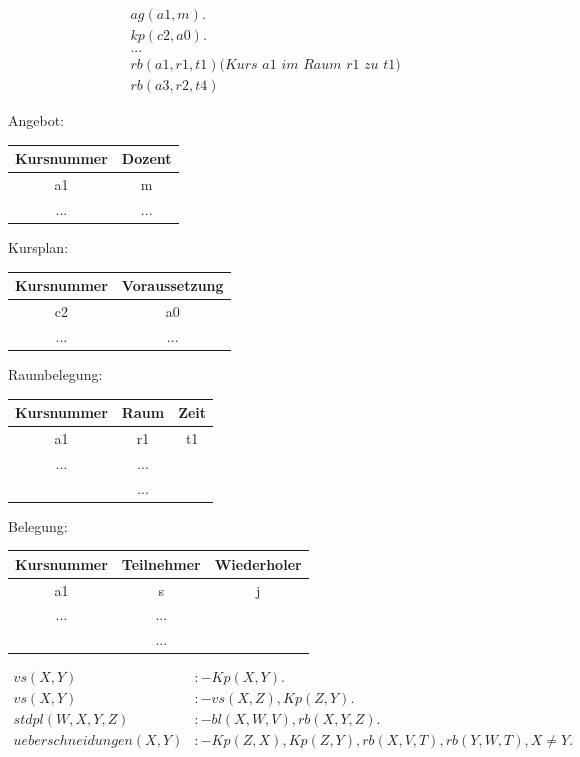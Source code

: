 \documentclass[12pt, a4paper]{article}
\begin{document}
\begin{equation}
\begin{split}
&ag(a1, m).\\
&kp(c2, a0).\\
&... \\
&rb(a1, r1, t1) \textit{(Kurs a1 im Raum r1 zu t1)}\\
&rb(a3,r2,t4)
\end{split}
\end{equation}

Angebot: \\
\begin{tabular}{|c|c|}
\hline
Kursnummer & Dozent\\ \hline
a1 & m \\
... & ... \\
\hline
\end{tabular}

Kursplan: \\
\begin{tabular}{|c|c|}
\hline
Kursnummer & Voraussetzung\\ \hline
c2 & a0 \\
... & ... \\
\hline
\end{tabular}

Raumbelegung: \\
\begin{tabular}{|c|c|c|}
\hline
Kursnummer & Raum & Zeit\\ \hline
a1 & r1 & t1 \\
... & ... \\ & ... \\
\hline
\end{tabular}

Belegung: \\
\begin{tabular}{|c|c|c|}
\hline
Kursnummer & Teilnehmer & Wiederholer\\ \hline
a1 & s & j \\
... & ... \\ & ... \\
\hline
\end{tabular}

\begin{equation}
\begin{split}
vs(X, Y) &:- Kp(X,Y). \\
vs(X, Y) &:- vs(X, Z), Kp(Z, Y). \\
stdpl(W,X,Y,Z) &:- bl(X, W, V), rb(X,Y,Z). \\
ueberschneidungen(X,Y) &:- Kp(Z, X), Kp(Z, Y), rb(X, V,T), rb(Y, W, T), X \neq Y.
\end{split}
\end{equation}
\end{document}
